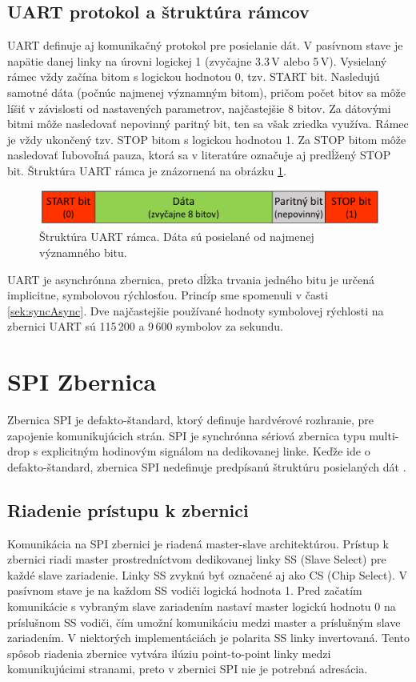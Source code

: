 \subsection{UART protokol a štruktúra rámcov}
UART definuje aj komunikačný protokol pre posielanie dát. V pasívnom stave je napätie danej linky na úrovni logickej 1 (zvyčajne 3.3\,V alebo 5\,V). Vysielaný rámec vždy začína bitom s logickou hodnotou 0, tzv. START bit.  Nasledujú samotné dáta (počnúc najmenej významným bitom), pričom počet bitov sa môže líšiť v závislosti od nastavených parametrov, najčastejšie 8 bitov. Za dátovými bitmi môže nasledovať nepovinný paritný bit, ten sa však zriedka využíva. Rámec je vždy ukončený tzv. STOP bitom s logickou hodnotou 1. Za STOP bitom môže nasledovať ľubovoľná pauza, ktorá sa v literatúre označuje aj predĺžený STOP bit. Štruktúra UART rámca je znázornená na obrázku \ref{obr:uartFrame}.

\begin{figure}
    \centerline{\includegraphics[width=1\textwidth]{images/busses/uartFrame.png}}
    \caption[Štruktúra UART rámca]{Štruktúra UART rámca. Dáta sú posielané od najmenej významného bitu.}
    \label{obr:uartFrame}
\end{figure}

UART je asynchrónna zbernica, preto dĺžka trvania jedného bitu je určená implicitne, symbolovou rýchlosťou. Princíp sme spomenuli v časti \ref{sek:syncAsync}. Dve najčastejšie používané hodnoty symbolovej rýchlosti na zbernici UART sú 115\,200 a 9\,600 symbolov za sekundu.

\section{SPI Zbernica}
Zbernica SPI je defakto-štandard, ktorý definuje hardvérové rozhranie, pre zapojenie komunikujúcich strán. SPI je synchrónna sériová zbernica typu multi-drop s explicitným hodinovým signálom na dedikovanej linke. Keďže ide o defakto-štandard, zbernica SPI nedefinuje predpísanú štruktúru posielaných dát \cite{spiBus}.

\subsection{Riadenie prístupu k zbernici}
Komunikácia na SPI zbernici je riadená master-slave architektúrou. Prístup k zbernici riadi master prostredníctvom dedikovanej linky SS (Slave Select) pre každé slave zariadenie. Linky SS zvyknú byť označené aj ako CS (Chip Select). V pasívnom stave je na každom SS vodiči logická hodnota 1. Pred začatím komunikácie s vybraným slave zariadením nastaví master logickú hodnotu 0 na príslušnom SS vodiči, čím umožní komunikáciu medzi master a príslušným slave zariadením. V niektorých implementáciách je polarita SS linky invertovaná. Tento spôsob riadenia zbernice vytvára ilúziu point-to-point linky medzi komunikujúcimi stranami, preto v zbernici SPI nie je potrebná adresácia.

